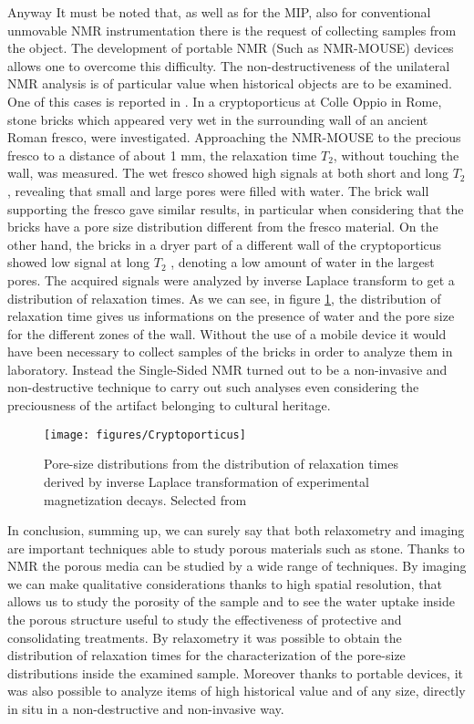 \documentclass[a4paper,11pt]{report}
\begin{document}
Anyway It must be noted that, as well as for the MIP, also for conventional unmovable NMR instrumentation there is the request of collecting samples from the object. The development of portable NMR (Such as NMR-MOUSE) devices allows one to overcome this difficulty. The non-destructiveness of the unilateral NMR analysis is of particular value when historical objects are to be examined. One of this cases is reported in \cite{seistone}. In a cryptoporticus at Colle Oppio in Rome, stone bricks which appeared very wet in the surrounding wall of an ancient Roman fresco, were investigated. Approaching the NMR-MOUSE to the precious fresco to a distance of about 1 mm,  the relaxation time $T_2$, without touching the wall, was measured. The wet fresco showed high signals at both short and long $T_2$, revealing that small and large pores were filled with water. The brick wall supporting the fresco gave similar results, in particular when considering that the bricks have a pore size distribution different from the fresco material. On the other hand, the bricks in a dryer part of a different wall of the cryptoporticus showed low signal at long $T_2$ , denoting a low amount of water in the largest pores. The acquired signals were analyzed by inverse Laplace transform to get a distribution of relaxation times. As we can see, in figure \ref{Cryptoporticus}, the distribution of relaxation time gives us informations on the presence of water and the pore size for the different zones of the wall. Without the use of a mobile device it would have been necessary to collect samples of the bricks in order to analyze them in laboratory. Instead the Single-Sided NMR turned out to be a non-invasive and non-destructive technique to carry out such analyses even considering the preciousness of the artifact belonging to cultural heritage. 
\begin{figure}[h] 
\centering
\texttt{[image: figures/Cryptoporticus]}
\caption{Pore-size distributions from the distribution of relaxation times derived by inverse Laplace transformation of experimental magnetization decays. Selected from \cite{seistone}} \label{Cryptoporticus}
	\end{figure}
	
In conclusion, summing up, we can surely say that both relaxometry and imaging are important techniques able to study porous materials such as stone. Thanks to NMR the porous media can be studied by a wide range of techniques. By imaging we can make qualitative considerations thanks to high spatial resolution, that allows us to study the porosity of the sample and to see the water uptake inside the porous structure useful to study the effectiveness of protective and consolidating treatments. By relaxometry it was possible to obtain the distribution of relaxation times for the characterization of the pore-size distributions inside the examined sample. Moreover thanks to portable devices, it was also possible to analyze items of high historical value and of any size, directly in situ in a non-destructive and non-invasive way.
\end{document}
